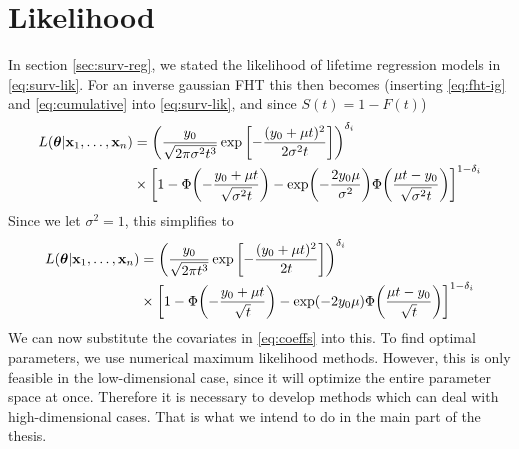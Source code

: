 \section{Likelihood}\label{sec:lik}
In section \ref{sec:surv-reg}, we stated the likelihood of lifetime regression models in \eqref{eq:surv-lik}. For an inverse gaussian FHT this then becomes (inserting \eqref{eq:fht-ig} and \eqref{eq:cumulative} into \eqref{eq:surv-lik}, and since $S(t)=1-F(t)$)
\begin{align}\label{eq:fht-lik}
\begin{split}
L(\btheta|\x_1,\ldots,\x_n)&=\p*{\frac{y_0}{\sqrt{2\pi\sigma^2t^3}}\exp\left[-\frac{(y_0+\mu t)^2}{2\sigma^2t}\right]}^{\delta_i}\\
&\times\sqb*{1-\Phi\p*{-\frac{y_0+\mu t}{\sqrt{\sigma^2t}}}-\exp\p*{-\frac{2y_0\mu}{\sigma^2}}\Phi\p*{\frac{\mu t-y_0}{\sqrt{\sigma^2t}}}}^{1-\delta_i}
\end{split}
\end{align}
Since we let $\sigma^2=1$, this simplifies to
\begin{align}
\begin{split}
L(\btheta|\x_1,\ldots,\x_n)&=\p*{\frac{y_0}{\sqrt{2\pi t^3}}\exp\left[-\frac{(y_0+\mu t)^2}{2t}\right]}^{\delta_i}\\
&\times\sqb*{1-\Phi\p*{-\frac{y_0+\mu t}{\sqrt{t}}}-\exp\p*{-2y_0\mu}\Phi\p*{\frac{\mu t-y_0}{\sqrt{t}}}}^{1-\delta_i}
\end{split}
\end{align}
We can now substitute the covariates in \eqref{eq:coeffs} into this. To find optimal parameters, we use numerical maximum likelihood methods. However, this is only feasible in the low-dimensional case, since it will optimize the entire parameter space at once.  Therefore it is necessary to develop methods which can deal with high-dimensional cases. That is what we intend to do in the main part of the thesis.


